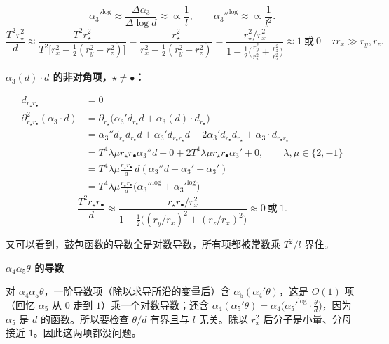 \[
{\alpha_3'}^{\log}\approx\frac{\Delta\alpha_3}{\Delta\log d}\approx\propto\frac{1}{l},
\qquad
{\alpha_3''}^{\log}\approx\propto\frac{1}{l^2}.
\]
\[
\frac{T^2r_\star^2}{d}\approx\frac{T^2r_\star^2}{T^2\big[r_x^2-\frac12(r_y^2+r_z^2)\big]}
=\frac{r_\star^2}{r_x^2-\frac12(r_y^2+r_z^2)}
=\frac{r_\star^2/r_x^2}{1-\frac12\Big(\frac{r_y^2}{r_x^2}+\frac{r_z^2}{r_x^2}\Big)}
\approx 1\ \text{或}\ 0\quad\because r_x\gg r_y,r_z.
\]

\medskip
\noindent\textbf{$\alpha_3(d)\cdot d$ 的非对角项，$\star\ne\bullet$：}\par
\begin{align*}
d_{r_\star r_\bullet}&=0\\
\partial^2_{r_\star r_\bullet}(\alpha_3\cdot d)&=\partial_{r_\star}\big(\alpha_3'd_{r_\bullet}d+\alpha_3(d)\cdot d_{r_\bullet}\big)\\
&=\alpha_3''d_{r_\star}d_{r_\bullet}d+\alpha_3'd_{r_\bullet r_\star}d+2\alpha_3'd_{r_\bullet}d_{r_\star}+\alpha_3\cdot d_{r_\bullet r_\star}\\
&=T^4\lambda\mu r_\star r_\bullet\alpha_3''d+0+2T^4\lambda\mu r_\star r_\bullet\alpha_3'+0,\qquad\lambda,\mu\in\{2,-1\}\\
&=T^4\lambda\mu\frac{r_\star r_\bullet}{d}\,d(\alpha_3''d+\alpha_3'+\alpha_3')\\
&=T^4\lambda\mu\frac{r_\star r_\bullet}{d}\big({\alpha_3''}^{\log}+{\alpha_3'}^{\log}\big)
\end{align*}
\[
\frac{T^2r_\star r_\bullet}{d}\approx\frac{r_\star r_\bullet/r_x^2}{1-\frac12\big((r_y/r_x)^2+(r_z/r_x)^2\big)}\approx 0\ \text{或}\ 1.
\]

又可以看到，鼓包函数的导数全是对数导数，所有项都被常数乘 $T^2/l$ 界住。

\medskip
\noindent\textbf{$\alpha_4\alpha_5\theta$ 的导数}\par
对 $\alpha_4\alpha_5\theta$，一阶导数项（除以求导所沿的变量后）含 $\alpha_5(\alpha_4'\theta)$，这是 $O(1)$ 项（回忆 $\alpha_5$ 从 $0$ 走到 $1$）乘一个对数导数；还含 $\alpha_4(\alpha_5'\theta)=\alpha_4\big({\alpha_5'}^{\log}\cdot\frac{\theta}{d}\big)$，因为 $\alpha_5$ 是 $d$ 的函数。所以要检查 $\theta/d$ 有界且与 $l$ 无关。除以 $r_x^2$ 后分子是小量、分母接近 $1$。因此这两项都没问题。

